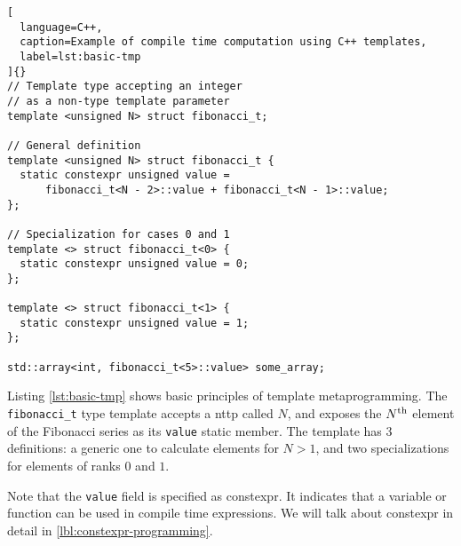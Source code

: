 \documentclass[../main]{subfiles}
\begin{document}
\begin{lstlisting}[
  language=C++,
  caption=Example of compile time computation using C++ templates,
  label=lst:basic-tmp
]{}
// Template type accepting an integer
// as a non-type template parameter
template <unsigned N> struct fibonacci_t;

// General definition
template <unsigned N> struct fibonacci_t {
  static constexpr unsigned value =
      fibonacci_t<N - 2>::value + fibonacci_t<N - 1>::value;
};

// Specialization for cases 0 and 1
template <> struct fibonacci_t<0> {
  static constexpr unsigned value = 0;
};

template <> struct fibonacci_t<1> {
  static constexpr unsigned value = 1;
};

std::array<int, fibonacci_t<5>::value> some_array;
\end{lstlisting}

Listing \ref{lst:basic-tmp} shows basic principles of \cpp template
metaprogramming. The \lstinline{fibonacci_t} type template accepts a
\acrshort{nttp} called $N$, and exposes the
$N\textsuperscript{th}$ element of the Fibonacci series as its
\lstinline{value} static member. The template has 3 definitions:
a generic one to calculate elements for $N > 1$,
and two specializations for elements of ranks $0$ and $1$.

Note that the \lstinline{value} field is specified as \gls{constexpr}.
It indicates that a variable or function can be used in compile time
expressions.
We will talk about \gls{constexpr} in detail in \ref{lbl:constexpr-programming}.
\end{document}
